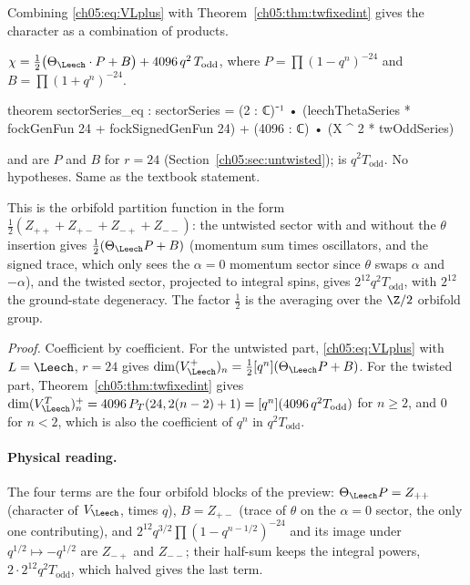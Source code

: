 Combining \eqref{ch05:eq:VLplus} with Theorem~\ref{ch05:thm:twfixedint} gives the character as a
combination of products.

\begin{theorem}\label{ch05:thm:sectoreq}
$\chi = \tfrac12\bigl(\Theta_\Leech\cdot P + B\bigr) + 4096\,q^2\,T_{\mathrm{odd}}$, where $P =
\prod(1-q^n)^{-24}$ and $B = \prod(1+q^n)^{-24}$.
\end{theorem}
\begin{leancode}
theorem sectorSeries_eq :
    sectorSeries
      = (2 : ℂ)⁻¹ • (leechThetaSeries * fockGenFun 24 + fockSignedGenFun 24)
        + (4096 : ℂ) • (X ^ 2 * twOddSeries)
\end{leancode}
\begin{dictionary}
 and  are $P$ and $B$ for $r = 24$
(Section~\ref{ch05:sec:untwisted});  is $q^2T_{\mathrm{odd}}$. No hypotheses.
Same as the textbook statement.
\end{dictionary}

\begin{physics}
This is the orbifold partition function in the form $\tfrac12(Z_{++}+Z_{+-}+Z_{-+}+Z_{--})$: the untwisted sector with and without the $\theta$ insertion gives $\tfrac12(\Theta_\Leech P+B)$ (momentum sum times oscillators, and the signed trace, which only sees the $\alpha=0$ momentum sector since $\theta$ swaps $\alpha$ and $-\alpha$), and the twisted sector, projected to integral spins, gives $2^{12}q^2T_{\mathrm{odd}}$, with $2^{12}$ the ground-state degeneracy. The factor $\tfrac12$ is the averaging over the $\Z/2$ orbifold group.
\end{physics}
\noindent\emph{Proof.} Coefficient by coefficient. For the untwisted part, \eqref{ch05:eq:VLplus} with
$L = \Leech$, $r = 24$ gives $\dim(V_\Leech^+)_n = \tfrac12[q^n](\Theta_\Leech P + B)$. For the twisted part,
Theorem~\ref{ch05:thm:twfixedint} gives $\dim(V_\Leech^T)^+_n = 4096\,P_T(24,2(n-2)+1) =
[q^n](4096\,q^2T_{\mathrm{odd}})$ for $n\ge2$, and $0$ for $n<2$, which is also the coefficient of
$q^n$ in $q^2T_{\mathrm{odd}}$.

\paragraph{Physical reading.} The four terms are the four orbifold blocks of the preview:
$\Theta_\Leech P = Z_{++}$ (character of $V_\Leech$, times $q$), $B = Z_{+-}$ (trace of $\theta$ on the
$\alpha = 0$ sector, the only one contributing), and $2^{12}q^{3/2}\prod(1-q^{n-1/2})^{-24}$ and its
image under $q^{1/2}\mapsto -q^{1/2}$ are $Z_{-+}$ and $Z_{--}$; their half-sum keeps the integral
powers, $2\cdot 2^{12}q^2T_{\mathrm{odd}}$, which halved gives the last term.

